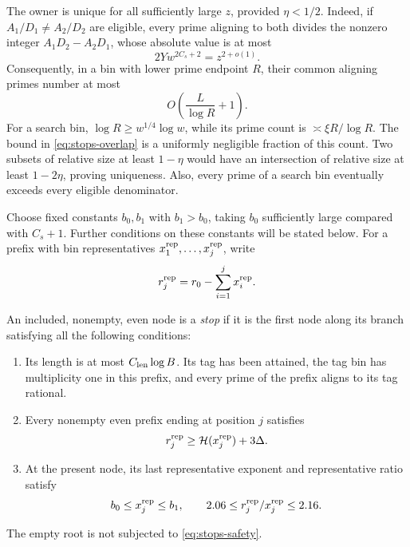 The owner is unique for all sufficiently large $z$, provided
$\eta<1/2$.  Indeed, if $A_1/D_1\ne A_2/D_2$ are eligible, every
prime aligning to both divides the nonzero integer
$A_1D_2-A_2D_1$, whose absolute value is at most
\[
 2Yw^{2C_s+2}=z^{2+o(1)}.
\]
Consequently, in a bin with lower prime endpoint $R$, their common
aligning primes number at most
\begin{equation}\label{eq:stops-overlap}
 O\left(\frac{L}{\log R}+1\right).
\end{equation}
For a search bin, $\log R\ge w^{1/4}\log w$, while its prime count
is $\asymp\xi R/\log R$.  The bound in
\eqref{eq:stops-overlap} is a uniformly negligible fraction of this
count.  Two subsets of relative size at least $1-\eta$ would have an
intersection of relative size at least $1-2\eta$, proving uniqueness.
Also, every prime of a search bin eventually exceeds every eligible
denominator.

Choose fixed constants $b_0,b_1$ with $b_1>b_0$, taking $b_0$
sufficiently large compared with $C_s+1$.  Further conditions on these
constants will be stated below.  For a prefix with bin representatives
$x_1^{\rm rep},\ldots,x_j^{\rm rep}$, write
\[
 r_j^{\rm rep}=r_0-\sum_{i=1}^j x_i^{\rm rep}.
\]

\begin{definition}\label{def:stops-rule}
An included, nonempty, even node is a \emph{stop} if it is the first
node along its branch satisfying all the following conditions:
\begin{enumerate}[label=(\roman*)]
\item Its length is at most $C_{\rm len}\log B$.  Its tag has been
attained, the tag bin has multiplicity one in this prefix, and every
prime of the prefix aligns to its tag rational.
\item Every nonempty even prefix ending at position $j$ satisfies
\begin{equation}\label{eq:stops-safety}
 r_j^{\rm rep}\ge \mathcal H(x_j^{\rm rep})+3\Delta.
\end{equation}
\item At the present node, its last representative exponent and
representative ratio satisfy
\begin{equation}\label{eq:stops-window}
 b_0\le x_j^{\rm rep}\le b_1,
 \qquad
 2.06\le r_j^{\rm rep}/x_j^{\rm rep}\le2.16.
\end{equation}
\end{enumerate}
The empty root is not subjected to \eqref{eq:stops-safety}.
\end{definition}


